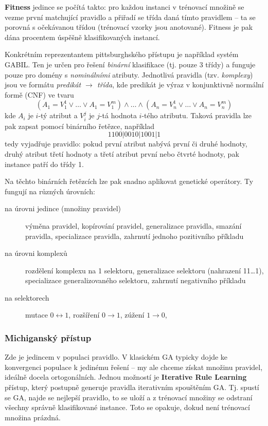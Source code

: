 \textbf{Fitness} jedince se počítá takto: pro každou instanci v trénovací množině se vezme první matchující pravidlo a přiřadí se třída daná tímto pravidlem -- ta se porovná s očekávanou třídou (trénovací vzorky jsou anotované). Fitness je pak dána procentem úspěšně klasifikovaných instancí.

Konkrétním reprezentantem pittsburghského přístupu je například systém GABIL. Ten je určen pro řešení \textit{binární} klasifikace (tj. pouze 3 třídy) a funguje pouze pro domény s \textit{nominálními} atributy. Jednotlivá pravidla (tzv. \textit{komplexy}) jsou ve formátu \textit{predikát $\rightarrow$ třída}, kde predikát je výraz v konjunktivně normální formě (CNF) ve tvaru
$$(A_1 = V_1^1 \lor \dots \lor A_1 = V_1^m) \land \dots \land (A_n = V_n^1 \lor \dots \lor A_n = V_n^m)$$
kde $A_i$ je $i$-tý atribut a $V_i^j$ je $j$-tá hodnota $i$-tého atributu. Taková pravidla lze pak zapsat pomocí binárního řetězce, například 
$$1100|0010|1001|1$$
tedy vyjadřuje pravidlo: pokud první atribut nabývá první či druhé hodnoty, druhý atribut třetí hodnoty a třetí atribut první nebo čtvrté hodnoty, pak instance patří do třídy 1. 

Na těchto binárních řetězcích lze pak snadno aplikovat genetické operátory. Ty fungují na různých úrovních:
\begin{description}
	
	
	\item[na úrovni jedince (množiny pravidel)] výměna pravidel, kopírování pravidel, generalizace pravidla, smazání pravidla, specializace pravidla, zahrnutí jednoho pozitivního příkladu
	\item[na úrovni komplexů] rozdělení komplexu na 1 selektoru, generalizace selektoru (nahrazení 11\dots1), specializace
	generalizovaného selektoru, zahrnutí negativního příkladu
	\item[na selektorech] mutace $0 \leftrightarrow 1$, rozšíření $0 \rightarrow 1$, zúžení $1 \rightarrow 0$,
\end{description}

\subsubsection{Michiganský přístup}
Zde je jedincem v populaci pravidlo. V klasickém GA typicky dojde ke konvergenci populace k jedinému řešení -- my ale chceme získat množinu pravidel, ideálně docela ortogonálních. Jednou možností je \textbf{Iterative Rule Learning} přístup, který postupně generuje pravidla iterativním spouštěním GA. Tj. spustí se GA, najde se nejlepší pravidlo, to se uloží a z trénovací množiny se odstraní všechny správně klasifikované instance. Toto se opakuje, dokud není trénovací množina prázdná.

